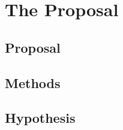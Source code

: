 \documentclass[linenumbers,trackchanges]{aastex7}
\begin{document}
\section{The Proposal} 

\subsection{Proposal}

\subsection{Methods}

\subsection{Hypothesis}
\end{document}
